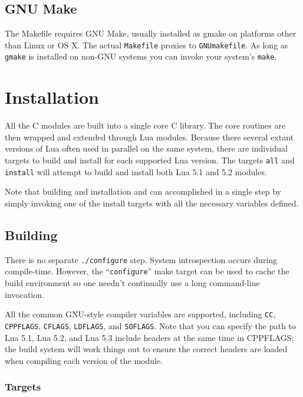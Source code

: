 \documentclass[11pt, oneside]{memoir}
\begin{document}
\section{GNU Make}

The Makefile requires GNU Make, usually installed as gmake on platforms other than Linux or OS X. The actual \texttt{Makefile} proxies to \texttt{GNUmakefile}. As long as \texttt{gmake} is installed on non-GNU systems you can invoke your system's \texttt{make}.

\chapter{Installation}

All the C modules are built into a single core C library. The core routines are then wrapped and extended through Lua modules. Because there several extant versions of Lua often used in parallel on the same system, there are individual targets to build and install for each supported Lua version. The targets \texttt{all} and \texttt{install} will attempt to build and install both Lua 5.1 and 5.2 modules.

Note that building and installation and can accomplished in a single step by simply invoking one of the install targets with all the necessary variables defined.

\section{Building}

There is no separate \texttt{./configure} step. System introspection occurs during compile-time. However, the ``\texttt{configure}'' make target can be used to cache the build environment so one needn't continually use a long command-line invocation.

All the common GNU-style compiler variables are supported, including \texttt{CC}, \texttt{CPPFLAGS}, \texttt{CFLAGS}, \texttt{LDFLAGS}, and \texttt{SOFLAGS}. Note that you can specify the path to Lua 5.1, Lua 5.2, and Lua 5.3 include headers at the same time in CPPFLAGS; the build system will work things out to ensure the correct headers are loaded when compiling each version of the module.

\subsection{Targets}
\end{document}
